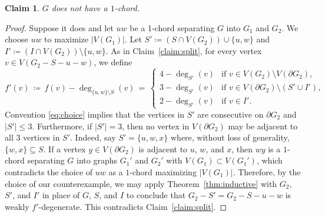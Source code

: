 \documentclass[11pt]{article}
\theoremstyle{slantthm}
\newtheorem{claim}{Claim}%
\numberwithin{equation}{section}
\theoremstyle{definition}
\renewcommand{\leq}{\leqslant}
\newcommand{\defeq}{\coloneqq}
\numberwithin{equation}{section}
\newcommand{\0}{\varnothing}
\newcommand{\set}[1]{\{#1\}}
\newcommand{\bdry}[1]{{\partial #1}}
\newcommand\eve[1]{{\color{nicelavender}{#1}}}
\begin{document}
    \begin{claim}\label{claim:1chord} $G$ does not have a $1$-chord.
\end{claim}
\begin{proof}
    Suppose it does and let $uw$ be a 1-chord separating $G$ into $G_1$ and $G_2$. We choose $uw$ to maximize $|V(G_1)|$. Let $S' \defeq (S \cap V(G_2)) \cup \set{u,w}$ and $I' \defeq (I \cap V(G_2)) \setminus \set{u,w}$. As in Claim~\ref{claim:split}, for every vertex $v \in V(G_2 - S - u - w)$, we define
    \[
        f'(v) \,\defeq\, f(v) - \deg_{\set{u,w} \setminus S} (v) \,=\, \begin{cases}
            4 - \deg_{S'}(v) &\text{if } v \in V(G_2) \setminus V(\bdry{G_2}),\\
            3 - \deg_{S'}(v) &\text{if } v \in V(\bdry{G_2}) \setminus (S' \cup I'),\\
            2 - \deg_{S'}(v) &\text{if } v \in I'.
            \end{cases}%
    \]
    Convention \eqref{eq:choice} implies that the vertices in $S'$ are consecutive on $\bdry{G_2}$ and $|S'| \leq 3$. Furthermore, if $|S'| = 3$, then no vertex in $V(\bdry{G_2})$ may be adjacent to all $3$ vertices in $S'$. Indeed, say $S' = \set{u,w,x}$ where, without loss of generality, $\set{w,x} \subseteq S$. If a vertex $y \in V(\bdry{G_2})$ is adjacent to $u$, $w$, and $x$, then $wy$ is a $1$-chord separating $G$ into graphs $G_1'$ and $G_2'$ with $V(G_1) \subset V(G_1')$, which contradicts the choice of $uw$ as a $1$-chord maximizing $|V(G_1)|$. Therefore, by the choice of our counterexample, we may apply Theorem~\ref{thm:inductive} with $G_2$, $S'$, and $I'$ %
    in place of $G$, $S$, and $I$ to conclude that $G_2 - S' = G_2 - S - u - w$ is weakly $f'$-degenerate. This contradicts Claim~\ref{claim:split}. %

\end{proof}
\end{document}
